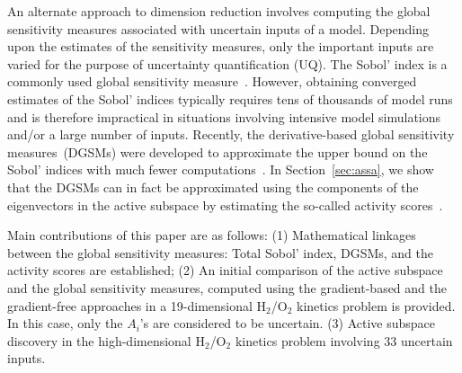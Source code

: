 An alternate approach to dimension reduction involves computing the global sensitivity
measures associated with uncertain inputs of a model. Depending upon the estimates of
the sensitivity measures, only the important inputs are varied for the purpose of
uncertainty quantification (UQ). The
Sobol' index is a commonly used global sensitivity measure~\cite{Sobol:2001}. However, obtaining
converged estimates of the Sobol' indices typically requires tens of thousands of model
runs and is therefore impractical in situations involving intensive model simulations and/or a
large number of inputs.
Recently, the derivative-based global sensitivity measures~(DGSMs) were 
developed to approximate the upper bound on the Sobol' indices with much fewer
computations~\cite{Sobol:2009, Lamboni:2013}. In Section~\ref{sec:assa}, we show
that the DGSMs can in fact be approximated using the components of the eigenvectors
in the active subspace by estimating the so-called activity 
scores~\cite{Diaz:2016,Constantine:2017}.

Main contributions of this paper are as follows: (1) Mathematical linkages between the
global sensitivity measures: Total Sobol' index, DGSMs, and the activity scores are
established; (2) An initial comparison of the active subspace and the global sensitivity
measures, computed using the gradient-based and the gradient-free approaches in
a 19-dimensional H$_2$/O$_2$ kinetics problem is provided. In this case, only the $A_i$'s are
considered to be uncertain. (3) Active subspace discovery in the high-dimensional
H$_2$/O$_2$ kinetics problem involving 33 uncertain inputs. 
 
